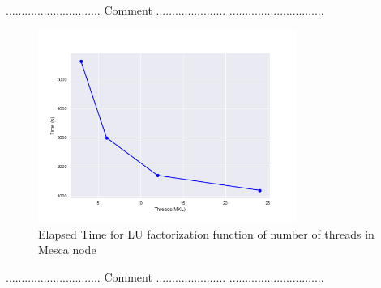 .............................. \newline
Comment ......................
.............................. \newline
\begin{figure}[]
\centering 
\includegraphics[width=0.75\textwidth]{images/TimeThreads.png}
\caption{Elapsed Time for LU factorization function of number of threads in Mesca node}
\label{Mesca_Time} 
\end{figure}

.............................. \newline
Comment ...................... 
.............................. \newline

